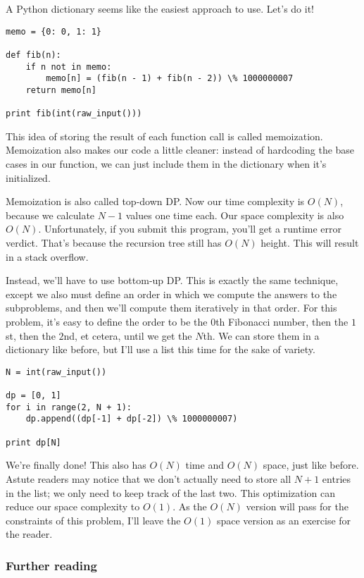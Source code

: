 A Python dictionary seems like the easiest approach to use. Let's do it!

\begin{verbatim}
memo = {0: 0, 1: 1}

def fib(n):
    if n not in memo:
        memo[n] = (fib(n - 1) + fib(n - 2)) \% 1000000007
    return memo[n]

print fib(int(raw_input()))
\end{verbatim}

This idea of storing the result of each function call is called memoization. Memoization also makes our code a little cleaner: instead of hardcoding the base cases in our function, we can just include them in the dictionary when it's initialized.

Memoization is also called top-down DP. Now our time complexity is $O(N)$, because we calculate $N - 1$ values one time each. Our space complexity is also $O(N)$. Unfortunately, if you submit this program, you'll get a runtime error verdict. That's because the recursion tree still has $O(N)$ height. This will result in a stack overflow.

Instead, we'll have to use bottom-up DP. This is exactly the same technique, except we also must define an order in which we compute the answers to the subproblems, and then we'll compute them iteratively in that order. For this problem, it's easy to define the order to be the $0$th Fibonacci number, then the $1$st, then the $2$nd, et cetera, until we get the $N$th. We can store them in a dictionary like before, but I'll use a list this time for the sake of variety.

\begin{verbatim}
N = int(raw_input())

dp = [0, 1]
for i in range(2, N + 1):
    dp.append((dp[-1] + dp[-2]) \% 1000000007)

print dp[N]
\end{verbatim}

We're finally done! This also has $O(N)$ time and $O(N)$ space, just like before. Astute readers may notice that we don't actually need to store all $N + 1$ entries in the list; we only need to keep track of the last two. This optimization can reduce our space complexity to $O(1)$. As the $O(N)$ version will pass for the constraints of this problem, I'll leave the $O(1)$ space version as an exercise for the reader.

\subsubsection*{Further reading}

